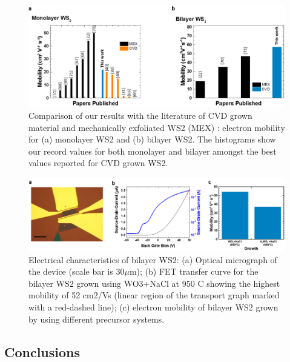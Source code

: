\documentclass[12pt]{article}
\begin{document}
\begin{figure}[h]
\begin{center}
\includegraphics[scale=0.3]{PaperMobilityComparison.png}
\caption{Comparison of our results with the literature of CVD grown material and mechanically exfoliated WS2 (MEX) : electron mobility for (a) monolayer WS2 and (b) bilayer WS2. The histograms show our record values for both monolayer and bilayer amongst the best values reported for CVD grown WS2.}
\label{fig:PaperMobilityComparison}
\end{center}
\end{figure}
 
\begin{figure}[h]
\begin{center}
\includegraphics[scale=0.3]{PaperElectricalMeasurementBilayer.png}
\caption{Electrical characteristics of bilayer WS2: (a) Optical micrograph of the device (scale bar is 30$\mu$m); (b) FET transfer curve for the bilayer WS2 grown using WO3+NaCl at 950 {\degree}C showing the highest mobility of 52 cm2/Vs (linear region of the transport graph marked with a red-dashed line); (c) electron mobility of bilayer WS2 grown by using different precursor systems.}
\label{fig:PaperElectricalMeasurementBilayer}
\end{center}
\end{figure}

\subsection{Conclusions}
\end{document}
